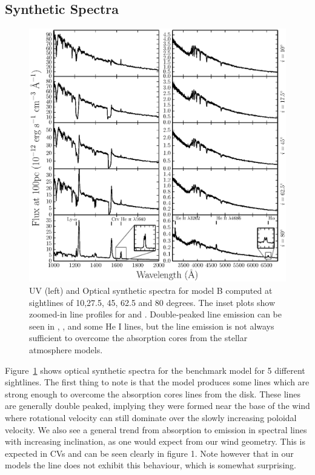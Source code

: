 \documentclass[preprint, a4paper, 11pt]{aastex}
\begin{document}
\subsection{Synthetic Spectra}

\begin{figure} %
\includegraphics[width=\textwidth]{figures/fig5_uv_opt.eps}
\caption{
UV (left) and Optical synthetic spectra for model B computed at
sightlines of 10,27.5, 45, 62.5 and 80 degrees.	
The inset plots show zoomed-in line profiles for 
\heiiuv and \ha. Double-peaked line emission can be seen in 
\heiiuv, \heiiopt, \ha and some He I lines, but the 
line emission is not always sufficient to overcome the absorption
cores from the stellar atmosphere models.
}
\label{spec}
\end{figure} %

Figure~\ref{spec} shows optical synthetic spectra for the benchmark 
model for 5 different sightlines. The first thing to note is that the 
model produces some lines which are strong enough to overcome
the absorption cores lines from the disk. These lines are generally double peaked, 
implying they were formed near the base of the wind where rotational velocity
can still dominate over the slowly increasing poloidal velocity. 
We also see a general trend from absorption to emission in spectral lines
with increasing inclination, as one would expect from our wind geometry.
This is expected in CVs and can be seen clearly in figure 1. Note however
that in our models the \heiiuv line does not exhibit this behaviour, which
is somewhat surprising.
\end{document}
